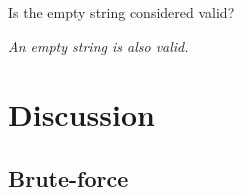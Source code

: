 \begin{QandA}
	\item Is the empty string considered valid?
	\begin{answered}
		\textit{An empty string is also valid.}
	\end{answered}
	
\end{QandA}

\section{Discussion}
\label{valid_parenthesis:sec:discussion}


\subsection{Brute-force}
\label{valid_parenthesis:sec:bruteforce}



